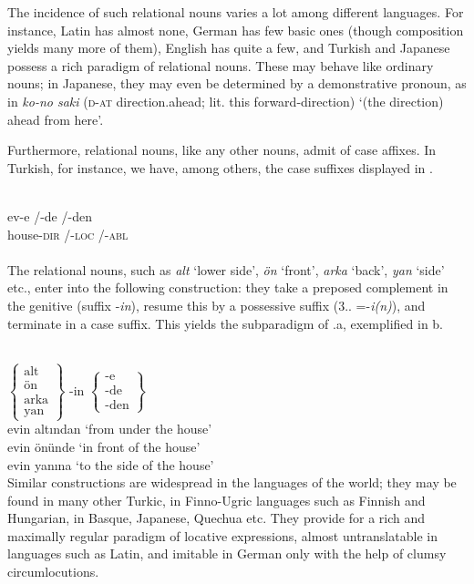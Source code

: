 The incidence of such relational nouns varies a lot among different languages. For instance, Latin has almost none, German has few basic ones (though composition yields many more of them), English has quite a few, and Turkish and Japanese possess a rich paradigm of relational nouns. These may behave like ordinary nouns; in Japanese, they may even be determined by a demonstrative pronoun, as in \textit{ko-no saki} (\textsc{d}-\textsc{at} direction.ahead; lit. this forward-direction) ‘(the direction) ahead from here’.

Furthermore, relational nouns, like any other nouns, admit of case affixes. In Turkish, for instance, we have, among others, the case suffixes displayed in .

\ea\label{ex:E49}
\langinfo{\LangTurk}{}{}\\
\gll   ev-e  /-de  /-den\\
 house-\textsc{dir}  /-\textsc{loc}  /-\textsc{abl}\\
\\
\z
\noindent The relational nouns, such as \textit{alt} ‘lower side’, \textit{ön} ‘front’, \textit{arka} ‘back’, \textit{yan} ‘side’ etc., enter into the following construction: they take a preposed complement in the genitive (suffix -\textit{in}), resume this by a possessive suffix (3.\pers. =-\textit{i(n)}), and terminate in a case suffix. This yields the subparadigm of .a, exemplified in b.

\ea\label{ex:E50}
  \\
  $\left\{\begin{array}{c}\text{alt}\\ \text{ön}\\ \text{arka}\\ \text{yan}\end{array}\right\}$   {-in}  
 $\left\{\begin{array}{c}\text{-e}\\ \text{-de}\\ \text{-den}\end{array}\right\}$ \\
\ex  evin altından  {\rm ‘from under the house’}\\
evin önünde  {\rm ‘in front of the house’}\\
evin yanına  {\rm ‘to the side of the house’} \\
\z
\z
\noindent Similar constructions are widespread in the languages of the world; they may be found in many other Turkic, in Finno-Ugric languages such as Finnish and Hungarian, in Basque, Japanese, Quechua etc. They provide for a rich and maximally regular paradigm of locative expressions, almost untranslatable in languages such as Latin, and imitable in German only with the help of clumsy circumlocutions.

